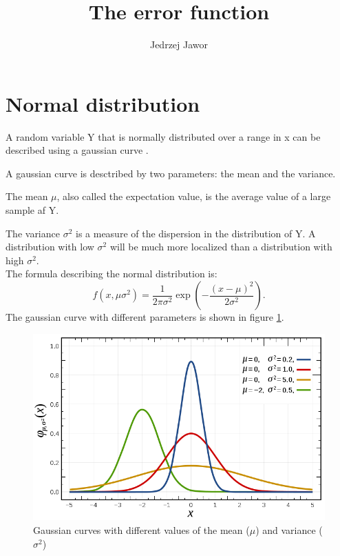 \documentclass{article}
\begin{document}
\title{The error function}
\author{Jedrzej Jawor}
\date{}
\maketitle

\section{Normal distribution}

A random variable Y that is normally distributed over a range in x can be described using a gaussian curve \cite{wikigauss}.
 
A gaussian curve is desctribed by two parameters: the mean and the variance. 

The mean $\mu$, also called the expectation value, is the average value 
of a large sample af Y.

The variance $\sigma^2$ is a measure of the dispersion in the distribution of Y. A distribution with low $\sigma^2$ will be much
more localized than a distribution with high $\sigma^2$.
\\
The formula describing the normal distribution is:
\begin{equation}
\label{eq:norm}
f(x,\mu \sigma^2) = \frac{1}{2 \pi \sigma^2} \exp(- \frac{(x-\mu)^2}{2 \sigma^2}).
\end{equation}
The gaussian curve with different parameters is shown in figure \ref{fig:gauss}. 


\begin{figure}[h]
\label{fig:gauss}
\includegraphics[width=\linewidth]{norm.png}
\caption{Gaussian curves with different values of the mean ($\mu$) and variance ($\sigma^2$)}
\end{figure} 
\end{document}
